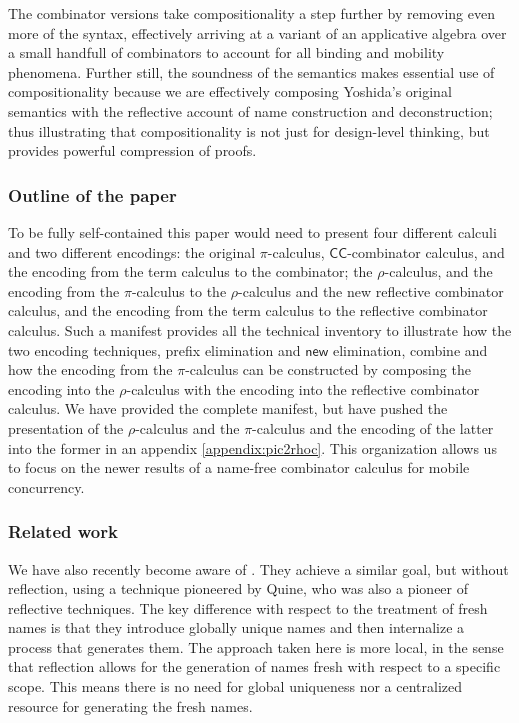 \documentclass[submission,copyright,creativecommons]{eptcs}
\newcommand{\new}{\mathsf{new}}
\newcommand{\pic}{$\pi$-calculus}
\newcommand{\ccomb}{$\mathsf{CC}$-combinator calculus}
\newcommand{\rhoc}{$\rho$-calculus}
\theoremstyle{definition}
\theoremstyle{remark}
\theoremstyle{remark}
\begin{document}
The combinator versions take compositionality a step further by
removing even more of the syntax, effectively arriving at a variant of
an applicative algebra over a small handfull of combinators to account
for all binding and mobility phenomena. Further still, the soundness
of the semantics makes essential use of compositionality because we
are effectively composing Yoshida's original semantics with the
reflective account of name construction and deconstruction; thus
illustrating that compositionality is not just for design-level
thinking, but provides powerful compression of proofs.

\subsubsection{Outline of the paper}
To be fully self-contained this paper would need to present four
different calculi and two different encodings: the original {\pic},
{\ccomb}, and the encoding from the term calculus
to the combinator; the {\rhoc}, and the encoding from the {\pic\;} to
the {\rhoc} and the new reflective combinator calculus, and the
encoding from the term calculus to the reflective combinator
calculus. Such a manifest provides all the technical inventory to
illustrate how the two encoding techniques, prefix elimination and
$\new$ elimination, combine and how the encoding from the {\pic\;} can
be constructed by composing the encoding into the {\rhoc} with the
encoding into the reflective combinator calculus. We have provided the
complete manifest, but have pushed the presentation of the {\rhoc} and
the {\pic\;} and the encoding of the latter into the former in an
appendix \ref{appendix:pic2rhoc}. This organization allows us to focus on the newer results of a
name-free combinator calculus for mobile concurrency.

\subsubsection{Related work}

We have also recently become aware of
\cite{DBLP:journals/toplas/RajaS97}. They achieve a similar goal, but
without reflection, using a technique pioneered by Quine, who was also
a pioneer of reflective techniques. \cite{Quine59} \cite{Quine60} The
key difference with respect to the treatment of fresh names is that
they introduce globally unique names and then internalize a process
that generates them. The approach taken here is more local, in the
sense that reflection allows for the generation of names fresh with
respect to a specific scope. This means there is no need for global
uniqueness nor a centralized resource for generating the fresh names.
\end{document}
